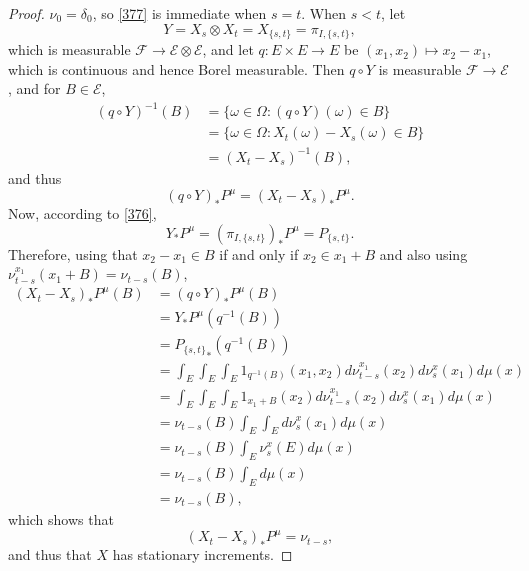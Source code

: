 \documentclass{article}
\theoremstyle{definition}
\begin{document}
\begin{proof}
$\nu_0=\delta_0$, so \eqref{377} is immediate when $s=t$. When $s<t$,
let 
\[
Y=X_s \otimes X_t=X_{\{s,t\}}=\pi_{I,\{s,t\}},
\]
which is measurable $\mathscr{F} \to \mathscr{E} \otimes \mathscr{E}$,
and let $q:E \times E \to E$ be
$(x_1,x_2) \mapsto x_2-x_1$, which is continuous and hence Borel measurable.
Then $q \circ Y$ is measurable $\mathscr{F} \to \mathscr{E}$, and for $B \in \mathscr{E}$, 
\begin{align*}
(q \circ Y)^{-1}(B) &= \{\omega \in \Omega: (q \circ Y)(\omega) \in  B\}\\
&=\{\omega \in \Omega: X_t(\omega)-X_s(\omega) \in B\}\\
&=(X_t-X_s)^{-1}(B),
\end{align*}
and thus
\begin{equation}
(q \circ Y)_*P^\mu = (X_t-X_s)_*P^\mu.
\label{qY}
\end{equation}
Now, according to \eqref{376},
\[
Y_*P^\mu = (\pi_{I,\{s,t\}})_*P^\mu = P_{\{s,t\}}.
\]
Therefore, using that $x_2-x_1 \in B$ if and only if $x_2 \in x_1+B$ and also using
$\nu_{t-s}^{x_1}(x_1+B)=\nu_{t-s}(B)$,
\begin{align*}
(X_t-X_s)_*P^\mu(B)&=(q \circ Y)_*P^\mu(B)\\
&=Y_*P^\mu(q^{-1}(B))\\
&={P_{\{s,t\}}}_*(q^{-1}(B))\\
&=\int_E \int_E \int_E 1_{q^{-1}(B)}(x_1,x_2) d\nu_{t-s}^{x_1}(x_2) d\nu_s^{x}(x_1) d\mu(x)\\
&=\int_E \int_E \int_E 1_{x_1+B}(x_2)  d\nu_{t-s}^{x_1}(x_2) d\nu_s^{x}(x_1) d\mu(x)\\
&=\nu_{t-s}(B) \int_E \int_E  d\nu_s^{x}(x_1) d\mu(x)\\
&=\nu_{t-s}(B) \int_E \nu_s^x(E) d\mu(x)\\
&=\nu_{t-s}(B) \int_E d\mu(x)\\
&=\nu_{t-s}(B),
\end{align*}
which shows that
\[
(X_t-X_s)_*P^\mu = \nu_{t-s},
\]
and thus that $X$ has stationary increments.


\end{proof}
\end{document}
